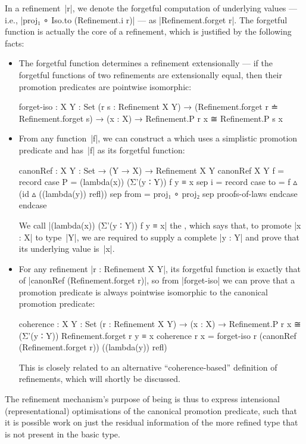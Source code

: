 In a refinement~|r|, we denote the forgetful computation of underlying values --- i.e., |proj₁ ∘ Iso.to (Refinement.i r)| --- as |Refinement.forget r|.
The forgetful function is actually the core of a refinement, which is justified by the following facts:
\begin{itemize}
\item The forgetful function determines a refinement extensionally --- if the forgetful functions of two refinements are extensionally equal, then their promotion predicates are pointwise isomorphic:
\begin{code}
forget-iso :  {X Y : Set} (r s : Refinement X Y) →
              (Refinement.forget r ≐ Refinement.forget s) →
              (x : X) → Refinement.P r x ≅ Refinement.P s x
\end{code}
\item From any function~|f|, we can construct a  which uses a simplistic promotion predicate and has~|f| as its forgetful function:
\begin{code}
canonRef : {X Y : Set} → (Y → X) → Refinement X Y
canonRef {X} {Y} f = record
  case  P  =  (lambda(x)) (Σ'(y ∶ Y)) f y ≡ x
  sep   i  =  record  case  to    =  f ▵ (id ▵ ((lambda(y)) refl))
                      sep   from  =  proj₁ ∘ proj₂
                      sep   proofs-of-laws endcase endcase
\end{code}
We call |(lambda(x)) (Σ'(y ∶ Y)) f y ≡ x| the , which says that, to promote |x : X| to type~|Y|, we are required to supply a complete |y : Y| and prove that its underlying value is~|x|.
\item For any refinement |r : Refinement X Y|, its forgetful function is exactly that of |canonRef (Refinement.forget r)|, so from |forget-iso| we can prove that a promotion predicate is always pointwise isomorphic to the canonical promotion predicate:
\begin{code}
coherence :  {X Y : Set} (r : Refinement X Y) →
             (x : X) →  Refinement.P r x
                          ≅ (Σ'(y ∶ Y)) Refinement.forget r y ≡ x
coherence r x = forget-iso r (canonRef (Refinement.forget r)) ((lambda(y)) refl)
\end{code}
This is closely related to an alternative ``coherence-based'' definition of refinements, which will shortly be discussed.
\end{itemize}
The refinement mechanism's purpose of being is thus to express intensional (representational) optimisations of the canonical promotion predicate, such that it is possible work on just the residual information of the more refined type that is not present in the basic type.

